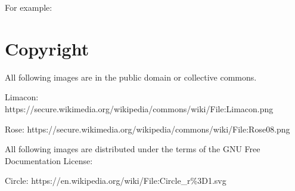 \documentclass{article}
\begin{document}
For example:

\section{Copyright}

All following images are in the public domain or collective commons.

Limacon: https://secure.wikimedia.org/wikipedia/commons/wiki/File:Limacon.png

Rose: https://secure.wikimedia.org/wikipedia/commons/wiki/File:Rose08.png

All following images are distributed under the terms of the GNU Free Documentation License:

Circle: https://en.wikipedia.org/wiki/File:Circle\_r\%3D1.svg
\end{document}
